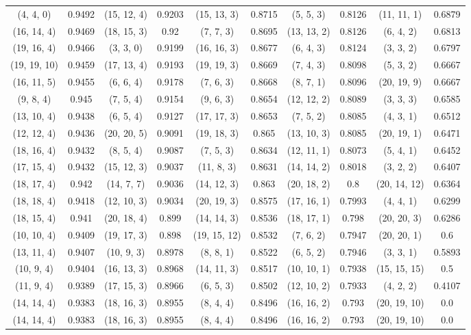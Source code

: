 \documentclass[UTF8]{ctexart}
\begin{document}
\begin{longtable}[H]{|cc|cc|cc|cc|cc|}
        (4, 4, 0)&0.9492&(15, 12, 4)&0.9203&(15, 13, 3)&0.8715&(5, 5, 3)&0.8126&(11, 11, 1)&0.6879\\
(16, 14, 4)&0.9469&(18, 15, 3)&0.92&(7, 7, 3)&0.8695&(13, 13, 2)&0.8126&(6, 4, 2)&0.6813\\
(19, 16, 4)&0.9466&(3, 3, 0)&0.9199&(16, 16, 3)&0.8677&(6, 4, 3)&0.8124&(3, 3, 2)&0.6797\\
(19, 19, 10)&0.9459&(17, 13, 4)&0.9193&(19, 19, 3)&0.8669&(7, 4, 3)&0.8098&(5, 3, 2)&0.6667\\
(16, 11, 5)&0.9455&(6, 6, 4)&0.9178&(7, 6, 3)&0.8668&(8, 7, 1)&0.8096&(20, 19, 9)&0.6667\\
(9, 8, 4)&0.945&(7, 5, 4)&0.9154&(9, 6, 3)&0.8654&(12, 12, 2)&0.8089&(3, 3, 3)&0.6585\\
(13, 10, 4)&0.9438&(6, 5, 4)&0.9127&(17, 17, 3)&0.8653&(7, 5, 2)&0.8085&(4, 3, 1)&0.6512\\
(12, 12, 4)&0.9436&(20, 20, 5)&0.9091&(19, 18, 3)&0.865&(13, 10, 3)&0.8085&(20, 19, 1)&0.6471\\
(18, 16, 4)&0.9432&(8, 5, 4)&0.9087&(7, 5, 3)&0.8634&(12, 11, 1)&0.8073&(5, 4, 1)&0.6452\\
(17, 15, 4)&0.9432&(15, 12, 3)&0.9037&(11, 8, 3)&0.8631&(14, 14, 2)&0.8018&(3, 2, 2)&0.6407\\
(18, 17, 4)&0.942&(14, 7, 7)&0.9036&(14, 12, 3)&0.863&(20, 18, 2)&0.8&(20, 14, 12)&0.6364\\
(18, 18, 4)&0.9418&(12, 10, 3)&0.9034&(20, 19, 3)&0.8575&(17, 16, 1)&0.7993&(4, 4, 1)&0.6299\\
(18, 15, 4)&0.941&(20, 18, 4)&0.899&(14, 14, 3)&0.8536&(18, 17, 1)&0.798&(20, 20, 3)&0.6286\\
(10, 10, 4)&0.9409&(19, 17, 3)&0.898&(19, 15, 12)&0.8532&(7, 6, 2)&0.7947&(20, 20, 1)&0.6\\
(13, 11, 4)&0.9407&(10, 9, 3)&0.8978&(8, 8, 1)&0.8522&(6, 5, 2)&0.7946&(3, 3, 1)&0.5893\\
(10, 9, 4)&0.9404&(16, 13, 3)&0.8968&(14, 11, 3)&0.8517&(10, 10, 1)&0.7938&(15, 15, 15)&0.5\\
(11, 9, 4)&0.9389&(17, 15, 3)&0.8966&(6, 5, 3)&0.8502&(12, 10, 2)&0.7933&(4, 2, 2)&0.4107\\
(14, 14, 4)&0.9383&(18, 16, 3)&0.8955&(8, 4, 4)&0.8496&(16, 16, 2)&0.793&(20, 19, 10)&0.0\\
(14, 14, 4)&0.9383&(18, 16, 3)&0.8955&(8, 4, 4)&0.8496&(16, 16, 2)&0.793&(20, 19, 10)&0.0\\
        \hline
\end{longtable}
\end{document}
